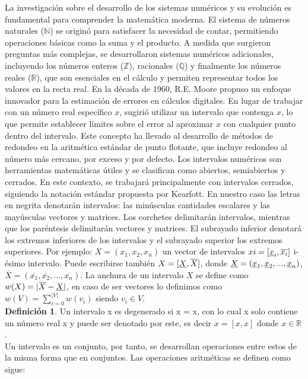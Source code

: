 \documentclass{article}
\begin{document}
La investigación sobre el desarrollo de los sistemas numéricos y su evolución es fundamental para comprender la matemática moderna. El sistema de números naturales 
($\mathbb{N}$) se originó para satisfacer la necesidad de contar, permitiendo operaciones básicas como la suma y el producto. A medida que surgieron preguntas más 
complejas, se desarrollaron sistemas numéricos adicionales, incluyendo los números enteros ($\mathbb{Z}$), racionales ($\mathbb{Q} $) y finalmente los números reales
 ($\mathbb{R}$), que son esenciales en el cálculo y permiten representar todos los valores en la recta real. En la década de 1960, R.E. Moore propuso un enfoque 
 innovador para la estimación de errores en cálculos digitales. En lugar de trabajar con un número real específico $x$, sugirió utilizar un intervalo que contenga 
 $x$, lo que permite establecer límites sobre el error al aproximar $x$ con cualquier punto dentro del intervalo. Este concepto ha llevado al desarrollo de métodos 
 de redondeo en la aritmética estándar de punto flotante, que incluye redondeo al número más cercano, por exceso y por defecto. Los intervalos numéricos son herramientas 
 matemáticas útiles y se clasifican como abiertos, semiabiertos y cerrados. En este contexto, se trabajará principalmente con intervalos cerrados, siguiendo la notación
  estándar propuesta por Kearfott. En nuestro caso las letras en negrita denotarán intervalos: las minúsculas cantidades escalares y las mayúsculas vectores y matrices. 
  Los corchetes delimitarán intervalos, mientras que los paréntesis delimitarán vectores y matrices. El subrayado inferior denotará los extremos inferiores de los intervalos
   y el subrayado superior los extremos superiores. Por ejemplo: $X = (x_1, x_2, x_n)$ un vector de intervalos $xi = [ \uline x_i, \overline{ x_i } ]$ i-ésimo intervalo. 
   Puede escribirse también $X = [ \uline X, \overline{ X } ]$, donde $\uline X = ( \uline x_1, \uline x_2, ..., \uline x_n)$, $\overline{X}= (\overline{x_1}, \overline{x_2}, ..., \overline{x_n})$. 
   La anchura de un intervalo $X$ se define como $w(X)=| \overline{X} - \uline X|$, en caso de ser vectores lo definimos como $w(V)=\sum_{i=0}^{|V|}w(v_i)$ siendo $v_i \in V$. \\

\textbf{ Definición 1}. Un intervalo x es degenerado si x = x, con lo cual x solo contiene un
número real x y puede ser denotado por este, es decir $x = [x,x]$ donde $x \in \mathbb{R}$.\\
   
Un intervalo es un conjunto, por tanto, se desarrollan operaciones entre estos de la misma forma que en conjuntos. Las operaciones aritméticas se definen como sigue: 
    
\end{document}
